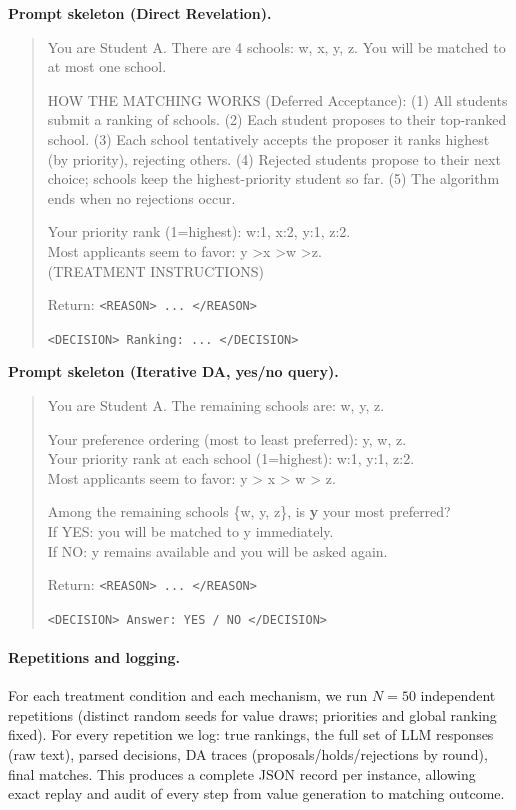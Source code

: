 \documentclass[format=acmsmall, review=false]{acmart}
\begin{document}
\vspace{.5cm}
\noindent\textbf{Prompt skeleton (Direct Revelation).}
\begin{quote}\small
You are Student A. There are 4 schools: w, x, y, z. You will be matched to at most one school.

HOW THE MATCHING WORKS (Deferred Acceptance):
(1) All students submit a ranking of schools.
(2) Each student proposes to their top-ranked school.
(3) Each school tentatively accepts the proposer it ranks highest (by priority), rejecting others.
(4) Rejected students propose to their next choice; schools keep the highest-priority student so far.
(5) The algorithm ends when no rejections occur.

Your priority rank (1=highest): \; w:1,\; x:2,\; y:1,\; z:2.\\
Most applicants seem to favor: \; y \textgreater x \textgreater w \textgreater z.\\
(TREATMENT INSTRUCTIONS)

Return:
\texttt{<REASON> ... </REASON>}

\texttt{<DECISION> Ranking: ... </DECISION>}
\end{quote}

\noindent\textbf{Prompt skeleton (Iterative DA, yes/no query).}
\begin{quote}\small
You are Student A. The remaining schools are: w, y, z.

Your preference ordering (most to least preferred): y, w, z.\\
Your priority rank at each school (1=highest): w:1, y:1, z:2.\\
Most applicants seem to favor: y \textgreater{} x \textgreater{} w \textgreater{} z.

Among the remaining schools \{w, y, z\}, is \textbf{y} your most preferred?\\
If YES: you will be matched to y immediately.\\
If NO: y remains available and you will be asked again.

Return:
\texttt{<REASON> ... </REASON>}

\texttt{<DECISION> Answer: YES / NO </DECISION>}
\end{quote}

\paragraph{Repetitions and logging.}
For each treatment condition and each mechanism, we run $N=50$ independent repetitions (distinct random seeds for value draws; priorities and global ranking fixed). For every repetition we log: true rankings, the full set of LLM responses (raw text), parsed decisions, DA traces (proposals/holds/rejections by round), final matches. This produces a complete JSON record per instance, allowing exact replay and audit of every step from value generation to matching outcome.
\end{document}
